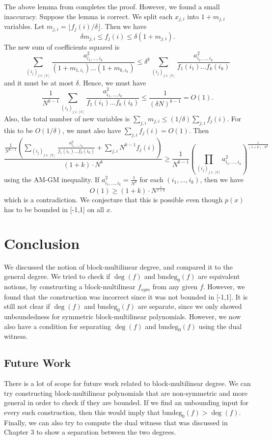 \documentclass[12pt]{report}
\newcommand{\bmdeg}{\mathrm{bmdeg}}
\begin{document}
The above lemma from \cite{paper1} completes the proof. However, we found a small inaccuracy. Suppose the lemma is correct. We split each $x_{j,i}$ into $1 + m_{j,i}$ variables. Let $m_{j,i} = \lfloor f_j(i)/\delta \rfloor$. Then we have
$$
\delta m_{j,i} \leq f_j(i) \leq \delta (1 + m_{j,i}).
$$
The new sum of coefficients squared is
$$
\sum_{(i_j)_{j \in [k]}} \frac{a_{i_1, \ldots, i_k}^2}{(1 + m_{1,i_1}) \ldots (1 + m_{k,i_k})} \leq \delta^k \sum_{(i_j)_{j \in [k]}} \frac{a_{i_1, \ldots, i_k}^2}{f_1(i_1) \ldots f_k(i_k)}
$$
and it must be at most $\delta$. Hence, we must have
$$
\frac{1}{N^{k-1}} \sum_{(i_j)_{j \in [k]}} \frac{a_{i_1, \ldots, i_k}^2}{f_1(i_1) \ldots f_k(i_k)} \leq \frac{1}{(\delta N)^{k-1}} = O(1).
$$
Also, the total number of new variables is $\sum_{j, i} m_{j,i} \leq (1/\delta) \sum_{j, i} f_j(i)$. For this to be $O(1/\delta)$, we must also have $\sum_{j, i} f_j(i) = O(1)$. Then
\begin{equation*}
\frac{\frac{1}{N^{k-1}} \left(\sum_{(i_j)_{j \in [k]}} \frac{a_{i_1, \ldots, i_k}^2}{f_1(i_1) \ldots f_k(i_k)} + \sum_{j, i} N^{k-1} f_j(i)\right)}{(1+k)\cdot N^k} \geq \frac{1}{N^{k-1}} \left(\prod_{(i_j)_{j \in [k]}} a_{i_1, \ldots, i_k}^2\right)^\frac{1}{(1+k) \cdot N^k}
\end{equation*}
using the AM-GM inequality. If $a_{i_1, \ldots, i_k}^2 = \frac{1}{N^k}$ for each $(i_1, \ldots, i_k)$, then we have
$$
O(1) \geq (1+k)\cdot N^\frac{1}{1+k}
$$ which is a contradiction. We conjecture that this is possible even though $p(x)$ has to be bounded in [-1,1] on all $x$.

\chapter{Conclusion}
We discussed the notion of block-multilinear degree, and compared it to the general degree. We tried to check if $\deg(f)$ and $\bmdeg_0(f)$ are equivalent notions, by constructing a block-multilinear $f_{sym}$ from any given $f$. However, we found that the construction was incorrect since it was not bounded in [-1,1]. It is still not clear if $\deg(f)$ and $\bmdeg_0(f)$ are separate, since we only showed unboundedness for symmetric block-multilinear polynomials. However, we now also have a condition for separating $\deg(f)$ and $\bmdeg_0(f)$ using the dual witness.

\section{Future Work}
There is a lot of scope for future work related to block-multilinear degree. We can try constructing block-multilinear polynomials that are non-symmetric and more general in order to check if they are bounded. If we find an unbounding input for every such construction, then this would imply that $\bmdeg_0(f) > \deg(f)$. Finally, we can also try to compute the dual witness that was discussed in Chapter 3 to show a separation between the two degrees.




\end{document}
